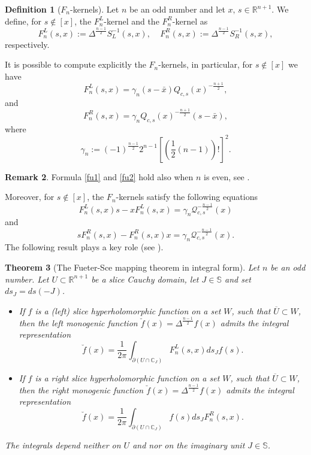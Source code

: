 \documentclass[reqno,11pt]{amsart}
\numberwithin{equation}{section}
\newtheorem{theorem}{Theorem}[section]
\theoremstyle{definition}
\newtheorem{remark}[theorem]{{\bf Remark}}
\newtheorem{definition}[theorem]{Definition}
\newcommand{\rr}{\mathbb{R}}
\begin{document}
\begin{definition}[$F_n$-kernels]
	Let $n$ be an odd number and let $x,\, s\in\rr^{n+1}$. We define, for $s\notin[x]$, the $F^L_n$-kernel and the $F^R_n$-kernel as
	$$
	F^L_n(s,x):=\Delta^{\frac{n-1}2}S^{-1}_L(s,x), \ \ \ \ \ F^R_n(s,x):=\Delta^{\frac{n-1}{2}}S^{-1}_R(s,x),
	$$
respectively.
\end{definition}
It is possible to compute explicitly the $F_n$-kernels, in particular, for $s\notin [x]$ we have
\begin{equation}
\label{fu1}
F^L_n(s,x)=\gamma_n(s-\bar x)Q_{c,s}(x)^{-\frac{n+1}2},
\end{equation}
and
\begin{equation}
\label{fu2}
F^R_n(s,x)=\gamma_n Q_{c,s}(x)^{-\frac{n+1}2}(s-\bar x),
\end{equation}
where
$$
\gamma_n:=(-1)^{\frac{n-1}2}2^{n-1}[(\frac 12(n-1))!]^2.
$$
\begin{remark}
Formula \eqref{fu1} and \eqref{fu2} hold also when $n$ is even, see \cite{CDQS}.
\end{remark}
 Moreover, for $s\notin [x]$, the $F_n$-kernels satisfy the following equations
\begin{equation}
	\label{p0}
	F_{n}^L(s,x)s-xF_{n}^L(s,x) =\gamma_n \mathcal{Q}_{c,s}^{-\frac{n-1}{2}}(x)
\end{equation}
and
\begin{equation}
	sF_{n}^R(s,x)-F_{n}^R(s,x) x=\gamma_n \mathcal{Q}_{c,s}^{-\frac{n-1}{2}}(x).
\end{equation}
The following result plays a key role (see \cite{CSS10}).
\begin{theorem}[The Fueter-Sce mapping theorem in integral form]
	\label{Fueter}
	Let $n$ be an odd number. Let $U\subset\mathbb{R}^{n+1}$ be a slice Cauchy domain, let $J\in\mathbb{S}$ and set  $ds_J=ds (-J)$.
	\begin{itemize}
		\item
		If $f$ is a (left) slice hyperholomorphic function on a set $W$, such that $\overline{U} \subset W$, then
		the left monogenic function  $\breve{f}(x)=\Delta^{\frac{n-1}2} f(x)$
		admits the integral representation
		\begin{equation}\label{FuetLSEC}
			\breve{f}(x)=\frac{1}{2 \pi}\int_{\partial (U\cap \mathbb{C}_J)} F_n^L(s,x)ds_J f(s).
		\end{equation}
		\item
		If $f$ is a right slice hyperholomorphic function on a set $W$, such that $\overline{U} \subset W$, then
		the right monogenic function $\breve{f}(x)=\Delta^{\frac{n-1}2} f(x)$
		admits the integral representation
		\begin{equation}\label{FuetRSCE}
			\breve{f}(x)=\frac{1}{2 \pi}\int_{\partial (U\cap \mathbb{C}_J)} f(s)ds_J F_n^R(s,x).
		\end{equation}
	\end{itemize}
	The integrals  depend neither on $U$ and nor on the imaginary unit $J\in\mathbb{S}$.
\end{theorem}
\end{document}
